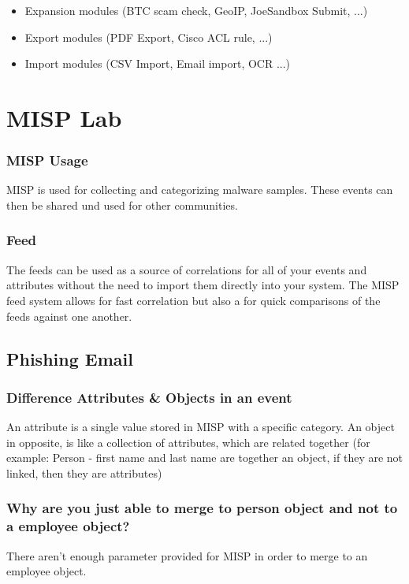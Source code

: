 \begin{itemize}
    \item Expansion modules (BTC scam check, GeoIP, JoeSandbox Submit, ...)
    \item Export modules (PDF Export, Cisco ACL rule, ...)
    \item Import modules (CSV Import, Email import, OCR ...)
\end{itemize}


\section{MISP Lab}
\subsubsection{MISP Usage}
MISP is used for collecting and categorizing malware samples. These events can then be shared und used for other communities.

\subsubsection{Feed}
The feeds can be used as a source of correlations for all of your events and attributes without the need to import them directly into your system. The MISP feed system allows for fast correlation but also a for quick comparisons of the feeds against one another.

\subsection{Phishing Email}

\subsubsection{Difference Attributes \& Objects in an event}
An attribute is a single value stored in MISP with a specific category. An object in opposite, is like a collection of attributes, which are related together (for example: Person - first name and last name are together an object, if they are not linked, then they are attributes)

\subsubsection{Why are you just able to merge to person object and not to a employee object?}
There aren't enough parameter provided for MISP in order to merge to an employee object.

